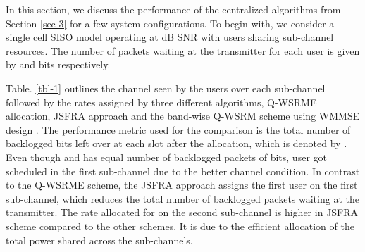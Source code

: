 
In this section, we discuss the performance of the centralized algorithms from Section \ref{sec-3} for a few system configurations. To begin with, we consider a single cell \ac{SISO} model operating at  dB \ac{SNR} with  users sharing  sub-channel resources. The number of packets waiting at the transmitter for each user is given by  and  bits respectively. 

Table. \ref{tbl-1} outlines the channel seen by the users over each sub-channel followed by the rates assigned by three different algorithms, \ac{Q-WSRME} allocation, \ac{JSFRA} approach and the band-wise \ac{Q-WSRM} scheme using \ac{WMMSE} design \cite{wmmse_shi}. The performance metric used for the comparison is the total number of backlogged bits left over at each slot after the allocation, which is denoted by . Even though  and  has equal number of backlogged packets of  bits, user  got scheduled in the first sub-channel due to the better channel condition. In contrast to the \ac{Q-WSRME} scheme, the \ac{JSFRA} approach assigns the first user on the first sub-channel, which reduces the total number of backlogged packets waiting at the transmitter. The rate allocated for  on the second sub-channel is higher in \ac{JSFRA} scheme compared to the other schemes. It is due to the efficient allocation of the total power shared across the sub-channels.
